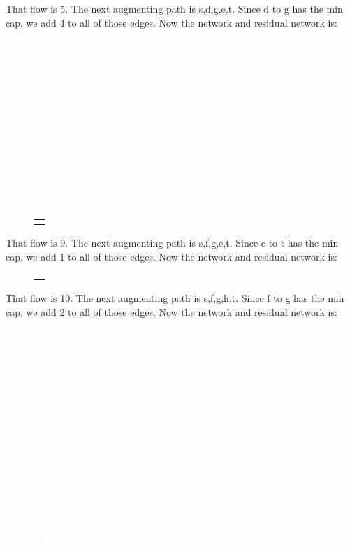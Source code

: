 \documentclass[12pt]{article}
\newenvironment{exercise}[2][Exercise]{\begin{trivlist}
		\item[\hskip \labelsep {\bfseries #1}\hskip \labelsep {\bfseries #2.}]}{\end{trivlist}}
\begin{document}
\begin{exercise}{1}
		That flow is 5. The next augmenting path is s,d,g,e,t. Since d to g has the min cap, we add 4 to all of those edges. Now the network and residual network is:\\\\\\\\\\\\\\\\\\\\\\\\\\\\
		\begin{figure}[h]
			\begin{center}
				\begin{tabular}{c}
					\qquad
					
				\end{tabular}
			\end{center}
		\end{figure}
	
		That flow is 9. The next augmenting path is s,f,g,e,t. Since e to t has the min cap, we add 1 to all of those edges. Now the network and residual network is:
		\begin{figure}[h]
			\begin{center}
				\begin{tabular}{c}
					\qquad
					
				\end{tabular}
			\end{center}
		\end{figure}
	
		That flow is 10. The next augmenting path is s,f,g,h,t. Since f to g has the min cap, we add 2 to all of those edges. Now the network and residual network is:\\\\\\\\\\\\\\\\\\\\\\\\\\\\\\\\
		\begin{figure}[h]
			\begin{center}
				\begin{tabular}{c}
					\qquad
					
				\end{tabular}
			\end{center}
		\end{figure}
		

\end{exercise}
\end{document}
